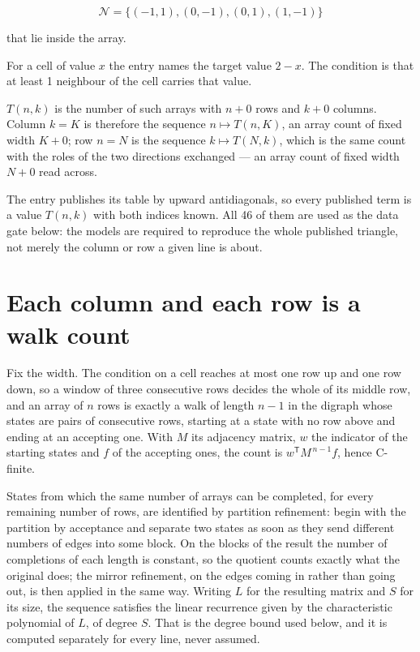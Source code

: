 \documentclass[11pt]{article}
\theoremstyle{definition}
\begin{document}
\[\mathcal{N} = \{(-1,1), (0,-1), (0,1), (1,-1)\}\]

that lie inside the array.

For a cell of value $x$ the entry names the target value $2 - x$. The condition is that at least 1 neighbour of the cell carries that value.

$T(n,k)$ is the number of such arrays with $n + 0$ rows and $k + 0$ columns. Column $k = K$ is therefore the sequence $n \mapsto T(n,K)$, an array count of fixed width $K + 0$; row $n = N$ is the sequence $k \mapsto T(N,k)$, which is the same count with the roles of the two directions exchanged --- an array count of fixed width $N + 0$ read across.

The entry publishes its table by upward antidiagonals, so every published term is a value $T(n,k)$ with both indices known. All 46 of them are used as the data gate below: the models are required to reproduce the whole published triangle, not merely the column or row a given line is about.

\section{Each column and each row is a walk count}

Fix the width. The condition on a cell reaches at most one row up and one row down, so a window of three consecutive rows decides the whole of its middle row, and an array of $n$ rows is exactly a walk of length $n-1$ in the digraph whose states are pairs of consecutive rows, starting at a state with no row above and ending at an accepting one. With $M$ its adjacency matrix, $w$ the indicator of the starting states and $f$ of the accepting ones, the count is $w^{\mathsf T}M^{\,n-1}f$, hence C-finite.

States from which the same number of arrays can be completed, for every remaining number of rows, are identified by partition refinement: begin with the partition by acceptance and separate two states as soon as they send different numbers of edges into some block. On the blocks of the result the number of completions of each length is constant, so the quotient counts exactly what the original does; the mirror refinement, on the edges coming in rather than going out, is then applied in the same way. Writing $L$ for the resulting matrix and $S$ for its size, the sequence satisfies the linear recurrence given by the characteristic polynomial of $L$, of degree $S$. That is the degree bound used below, and it is computed separately for every line, never assumed.
\end{document}

